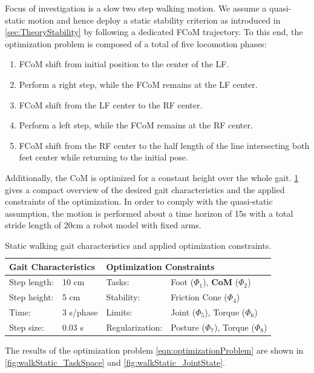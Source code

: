 Focus of investigation is a slow two step walking motion. We assume a quasi-static motion and hence deploy a static stability criterion as introduced in \cref{sec:TheoryStability} by following a dedicated \gls{FCoM} trajectory. To this end, the optimization problem is composed of a total of five locomotion phases: 
\begin{enumerate}
\item \gls{FCoM} shift from initial position to the center of the \gls{LF}.
\item Perform a right step, while the \gls{FCoM} remains at the \gls{LF} center. 
\item \gls{FCoM} shift from the \gls{LF} center to the \gls{RF} center. 
\item Perform a left step, while the \gls{FCoM} remains at the \gls{RF} center. 
\item \gls{FCoM} shift from the \gls{RF} center to the half length of the line intersecting both feet center while returning to the initial pose. 
\end{enumerate}
Additionally, the \gls{CoM} is optimized for a constant height over the whole gait. \cref{tab:walkStatic} gives a compact overview of the desired gait characteristics and the applied constraints of the optimization. In order to comply with the quasi-static assumption, the motion is performed about a time horizon of 15s with a total stride length of 20cm a robot model with fixed arms. 
\begin{table}[]
\centering
\caption{Static walking gait characteristics and applied optimization constraints.}
\begin{tabular}{|ll|ll|}
\hline
\multicolumn{2}{|l|}{\textbf{Gait Characteristics}} & \multicolumn{2}{l|}{\textbf{Optimization Constraints}} \\ \hline
Step length:& 10 cm 	& Tasks: 			& Foot ($\Phi_1$), \textbf{CoM} ($\Phi_2$)\\ \hline
Step height:& 5 cm 	& Stability: 		& Friction Cone ($\Phi_4$)\\ \hline
Time:& 3 s/phase 	& Limits: 			& Joint ($\Phi_5$), Torque ($\Phi_6$)\\ \hline
Step size:& 0.03 s	& Regularization: 	& Posture ($\Phi_7$), Torque ($\Phi_8$)\\ \hline
\end{tabular}
\label{tab:walkStatic}
\end{table}

The results of the optimization problem \cref{eqn:optimizationProblem} are shown in \cref{fig:walkStatic_TaskSpace} and \cref{fig:walkStatic_JointState}.

